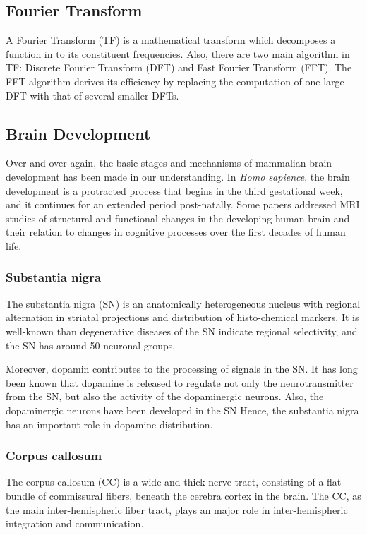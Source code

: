 \documentclass[10pt, a4paper]{article}
\begin{document}
		\subsection{Fourier Transform}
			A Fourier Transform (TF) is a mathematical transform which decomposes a function in to its constituent frequencies. Also, there are two main algorithm in TF: Discrete Fourier Transform (DFT) and Fast Fourier Transform (FFT). The FFT algorithm derives its efficiency by replacing the computation of one large DFT with that of several smaller DFTs. \cite{ref:FFT1}
			
		\subsection{Brain Development}
			Over and over again, the basic stages and mechanisms of mammalian brain development has been made in our understanding. In \textit{Homo sapience}, the brain development is a protracted process that begins in the third gestational week, and it continues for an extended period post-natally. \cite{ref:brain1} Some papers addressed MRI studies of structural and functional changes in the developing human brain and their relation to changes in cognitive processes over the first decades of human life. \cite{ref:brain2}
			
			\subsubsection{Substantia nigra}
				The substantia nigra (SN) is an anatomically heterogeneous nucleus with regional alternation in striatal projections and distribution of histo-chemical markers. \cite{ref:nigra1} It is well-known than degenerative diseases of the SN indicate regional selectivity, and the SN has around 50 neuronal groups. 
				
				Moreover, dopamin contributes to the processing of signals in the SN. \cite{ref:nigra3} It has long been known that dopamine is released to regulate not only the neurotransmitter from the SN, but also the activity of the dopaminergic neurons. \cite{ref:nigra2} Also, the dopaminergic neurons have been developed in the SN \cite{ref:nigra4} Hence, the substantia nigra has an important role in dopamine distribution. 
			
			\subsubsection{Corpus callosum}
				The corpus callosum (CC) is a wide and thick nerve tract, consisting of a flat bundle of commissural fibers, beneath the cerebra cortex in the brain. The CC, as the main inter-hemispheric fiber tract, plays an major role in inter-hemispheric integration and communication. \cite{ref:cc1} 
				
\end{document}
